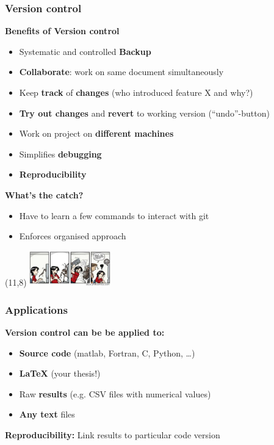 \documentclass{beamer}
\begin{document}
\begin{frame}
  \frametitle{Version control}
  \textbf{\Large Benefits of Version control}
  \begin{itemize}
  \item Systematic and controlled \textbf{Backup}
  \item \textbf{Collaborate}: work on same document simultaneously
  \item Keep \textbf{track} of \textbf{changes} (who introduced feature X and why?)
  \item \textbf{Try out changes} and \textbf{revert} to working version (``undo''-button)
  \item Work on project on \textbf{different machines}
  \item Simplifies \textbf{debugging}
  \item \textbf{Reproducibility}
  \end{itemize}
  \vspace{2ex}
  \textbf{\Large What's the catch?}
  \begin{itemize}
    \item Have to learn a few commands to interact with git
    \item Enforces organised approach
  \end{itemize}
  \begin{textblock}{1.0}(11,8)
    \includegraphics[width=3.5cm]{bughunting.png}
  \end{textblock}
\end{frame}


\begin{frame}
  \frametitle{Applications}
  \textbf{\Large Version control can be be applied to:}
  \begin{itemize}
  \item \textbf{Source code} (matlab, Fortran, C, Python, \dots)
  \item \textbf{LaTeX} (your thesis!)
  \item Raw \textbf{results} (e.g. CSV files with numerical values)
  \item \textbf{Any text} files\footnotemark
  \end{itemize}
  \vspace{4ex}
  \textbf{\Large Reproducibility:}
  Link results to particular code version
\end{frame}
\end{document}
